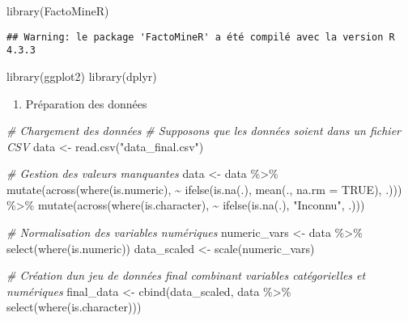 \documentclass[
]{article}
\newenvironment{Shaded}{\begin{snugshade}}{\end{snugshade}}
\newcommand{\AttributeTok}[1]{\textcolor[rgb]{0.77,0.63,0.00}{#1}}
\newcommand{\CommentTok}[1]{\textcolor[rgb]{0.56,0.35,0.01}{\textit{#1}}}
\newcommand{\ConstantTok}[1]{\textcolor[rgb]{0.00,0.00,0.00}{#1}}
\newcommand{\FunctionTok}[1]{\textcolor[rgb]{0.00,0.00,0.00}{#1}}
\newcommand{\NormalTok}[1]{#1}
\newcommand{\OtherTok}[1]{\textcolor[rgb]{0.56,0.35,0.01}{#1}}
\newcommand{\SpecialCharTok}[1]{\textcolor[rgb]{0.00,0.00,0.00}{#1}}
\newcommand{\StringTok}[1]{\textcolor[rgb]{0.31,0.60,0.02}{#1}}
\providecommand{\tightlist}{%
  \setlength{\itemsep}{0pt}\setlength{\parskip}{0pt}}
\begin{document}
\begin{Shaded}
\begin{Highlighting}[]
\FunctionTok{library}\NormalTok{(FactoMineR)}
\end{Highlighting}
\end{Shaded}

\begin{verbatim}
## Warning: le package 'FactoMineR' a été compilé avec la version R 4.3.3
\end{verbatim}

\begin{Shaded}
\begin{Highlighting}[]
\FunctionTok{library}\NormalTok{(ggplot2)}
\FunctionTok{library}\NormalTok{(dplyr)}
\end{Highlighting}
\end{Shaded}

\begin{enumerate}
\def\labelenumi{\arabic{enumi}.}
\tightlist
\item
  Préparation des données
\end{enumerate}

\begin{Shaded}
\begin{Highlighting}[]
\CommentTok{\# Chargement des données}
\CommentTok{\# Supposons que les données soient dans un fichier CSV}
\NormalTok{data }\OtherTok{\textless{}{-}} \FunctionTok{read.csv}\NormalTok{(}\StringTok{"data\_final.csv"}\NormalTok{)}

\CommentTok{\# Gestion des valeurs manquantes}
\NormalTok{data }\OtherTok{\textless{}{-}}\NormalTok{ data }\SpecialCharTok{\%\textgreater{}\%}
  \FunctionTok{mutate}\NormalTok{(}\FunctionTok{across}\NormalTok{(}\FunctionTok{where}\NormalTok{(is.numeric), }\SpecialCharTok{\textasciitilde{}} \FunctionTok{ifelse}\NormalTok{(}\FunctionTok{is.na}\NormalTok{(.), }\FunctionTok{mean}\NormalTok{(., }\AttributeTok{na.rm =} \ConstantTok{TRUE}\NormalTok{), .))) }\SpecialCharTok{\%\textgreater{}\%}
  \FunctionTok{mutate}\NormalTok{(}\FunctionTok{across}\NormalTok{(}\FunctionTok{where}\NormalTok{(is.character), }\SpecialCharTok{\textasciitilde{}} \FunctionTok{ifelse}\NormalTok{(}\FunctionTok{is.na}\NormalTok{(.), }\StringTok{"Inconnu"}\NormalTok{, .)))}

\CommentTok{\# Normalisation des variables numériques}
\NormalTok{numeric\_vars }\OtherTok{\textless{}{-}}\NormalTok{ data }\SpecialCharTok{\%\textgreater{}\%}
  \FunctionTok{select}\NormalTok{(}\FunctionTok{where}\NormalTok{(is.numeric))}
\NormalTok{data\_scaled }\OtherTok{\textless{}{-}} \FunctionTok{scale}\NormalTok{(numeric\_vars)}

\CommentTok{\# Création d\textquotesingle{}un jeu de données final combinant variables catégorielles et numériques}
\NormalTok{final\_data }\OtherTok{\textless{}{-}} \FunctionTok{cbind}\NormalTok{(data\_scaled, data }\SpecialCharTok{\%\textgreater{}\%} \FunctionTok{select}\NormalTok{(}\FunctionTok{where}\NormalTok{(is.character)))}
\end{Highlighting}
\end{Shaded}
\end{document}
